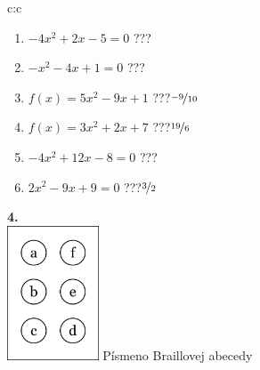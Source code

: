 \documentclass[10pt]{report}
\begin{document}
\begin{tabular}{c:c}
\begin{minipage}[c][104.5mm][t]{0.5\linewidth}
\begin{center}
\begin{minipage}{0.79\linewidth}
\begin{center}
\begin{varwidth}{\linewidth}
\begin{enumerate}
\Large
\item $-4x^2+2x-5=0$\quad \dotfill\; ???\;\dotfill {}
\item $-x^2-4x+1=0$\quad \dotfill\; ???\;\dotfill {}
\item $f(x)=5x^2-9x+1$\quad \dotfill\; ???\;\dotfill \quad $\nicefrac{-9}{10}$
\item $f(x)=3x^2+2x+7$\quad \dotfill\; ???\;\dotfill \quad $\nicefrac{19}{6}$
\item $-4x^2+12x-8=0$\quad \dotfill\; ???\;\dotfill {}
\item $2x^2-9x+9=0$\quad \dotfill\; ???\;\dotfill \quad $\nicefrac{3}{2}$
\end{enumerate}
\end{varwidth}
\end{center}
\end{minipage}
\begin{minipage}{0.20\linewidth}
\begin{center}
{\Huge\bfseries 4.} \\[2mm]
\includegraphics[height=40mm]{../images/braille.png}
{\small Písmeno Braillovej abecedy}
\end{center}
\end{minipage}
\end{center}
\end{minipage}
%
\end{tabular}
\newpage
\thispagestyle{empty}
\end{document}
